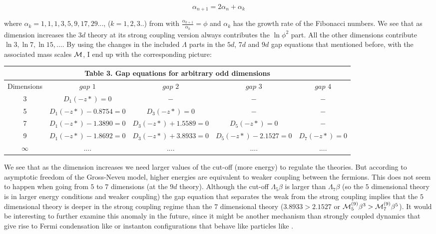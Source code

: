 \documentclass[twoside]{article}
\begin{document}
\begin{equation}
\alpha_{n+1}=2\alpha_n+\alpha_k
\end{equation}

where $\alpha_k=1,1,1,3,5,9,17,29...$, ($k=1,2,3..$) from \cite{OEIS} with $\frac{\alpha_{k+1}}{\alpha_{k}}=\phi$ and $\alpha_k$ has the growth rate of the Fibonacci numbers.
We see that as dimension increases the $3d$ theory at its strong coupling version always contributes the $\ln\phi^2$ part. All the other dimensions contribute $\ln3, \ln7, \ln15, ...$. By using the changes in the included $\Lambda$ parts in the $5d$, $7d$ and $9d$ gap equations that mentioned before, with the associated mass scales ${\cal M}$, I end up with the corresponding picture:

{\centering
	\begin{tabular}{|c|c|c|c|c|}
		\hline 
		\multicolumn{5}{|c|}{\textbf{Table 3. Gap equations for arbitrary odd dimensions}} \\ 
		\hline 
		Dimensions & $gap\,\,1$ & $gap\,\,2$ & $gap\,\,3$ & $gap\,\,4$ \\ 
		\hline 
		3 & $D_1(-z*)=0$ & $-$ & $-$ & $-$ \\ 
		\hline 
		5 & $D_1(-z*)-0.8754=0$ & $D_3(-z*)=0$ & $-$ & $-$ \\ 
		\hline 
		7 & $D_1(-z*)-1.3890=0$ & $D_3(-z*)+1.5589=0$ & $D_5(-z*)=0$ & $-$ \\ 
		\hline
		9 & $D_1(-z*)-1.8692=0$ & $D_3(-z*)+3.8933=0$ & $D_5(-z*)-2.1527=0$ & $D_7(-z*)=0$ \\ 
		\hline 
		$\infty$ & $....$ &  $....$ & $....$ & $....$ \\
		\hline 
	\end{tabular}\par}
	
We see that as the dimension increases we need larger values of the cut-off (more energy) to regulate the theories. But according to asymptotic freedom of the Gross-Neveu model, higher energies are equivalent to weaker coupling between the fermions. This does not seem to happen when going from $5$ to $7$ dimensions (at the $9d$ theory). Although the cut-off $\Lambda_5\beta$ is larger than $\Lambda_7\beta$ (so the $5$ dimensional theory is in larger energy conditions and weaker coupling) the gap equation that separates the weak from the strong coupling implies that the $5$ dimensional theory is deeper in the strong coupling regime than the $7$ dimensional theory ($3.8933>2.1527$ or ${\cal M}_5^{(9)}\beta^3>{\cal M}_7^{(9)}\beta^5$). It would be interesting to further examine this anomaly in the future, since it might be another mechanism than strongly coupled dynamics that give rise to Fermi condensation like \cite{Chu} or instanton configurations that behave like particles like \cite{Genolini}.	
\end{document}
